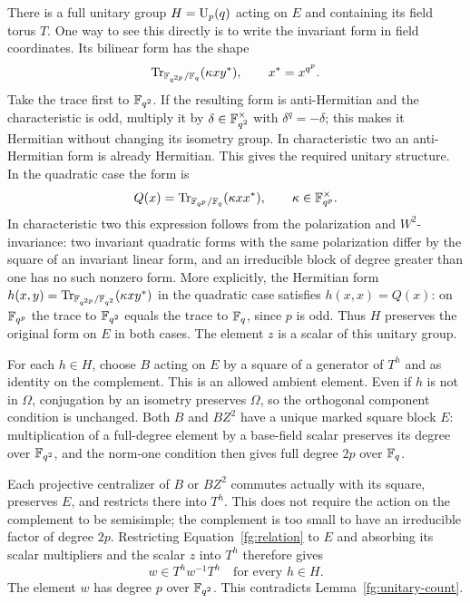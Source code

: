 There is a full unitary group $H=\operatorname{U}_p(q)$ acting on $E$ and
containing its field torus $T$. One way to see this directly is to
write the invariant form in field coordinates. Its bilinear form
has the shape
\[
 \operatorname{Tr}_{\mathbb F_{q^{2p}}/\mathbb F_q}(\kappa x y^*),\qquad x^*=x^{q^p}.
\]
Take the trace first to $\mathbb F_{q^2}$. If the resulting form is
anti-Hermitian and the characteristic is odd, multiply it by
$\delta\in\mathbb F_{q^2}^{\times}$ with $\delta^q=-\delta$; this makes
it Hermitian without changing its isometry group. In characteristic
two an anti-Hermitian form is already Hermitian. This gives the
required unitary structure. In the
quadratic case the form is
\[
 Q(x)=\operatorname{Tr}_{\mathbb F_{q^p}/\mathbb F_q}(\kappa xx^*),
 \qquad\kappa\in\mathbb F_{q^p}^\times.
\]
In characteristic two this expression follows from the polarization
and $W^2$-invariance: two invariant quadratic forms with the same
polarization differ by the square of an invariant linear form,
and an irreducible block of degree greater than one has no such
nonzero form. More explicitly, the Hermitian form
$h(x,y)=\operatorname{Tr}_{\mathbb F_{q^{2p}}/\mathbb F_{q^2}}(\kappa xy^*)$
in the quadratic case satisfies $h(x,x)=Q(x)$: on $\mathbb F_{q^p}$ the
trace to $\mathbb F_{q^2}$ equals the trace to $\mathbb F_q$, since $p$ is odd.
Thus $H$ preserves the original form on $E$ in both cases. The element
$z$ is a scalar of this unitary group.

For each $h\in H$, choose $B$ acting on $E$ by a square of a
generator of $T^h$ and as identity on the complement. This is an
allowed ambient element. Even if $h$ is not in $\Omega$, conjugation
by an isometry preserves $\Omega$, so the orthogonal component
condition is unchanged. Both $B$ and $BZ^2$ have a unique marked
square block $E$: multiplication of a full-degree element by a
base-field scalar preserves its degree over $\mathbb F_{q^2}$, and the
norm-one condition then gives full degree $2p$ over $\mathbb F_q$.

Each projective centralizer of $B$ or $BZ^2$ commutes actually with
its square, preserves $E$, and restricts there into $T^h$. This
does not require the action on the complement to be semisimple;
the complement is too small to have an irreducible factor of
degree $2p$. Restricting Equation~\eqref{fg:relation} to $E$
and absorbing its scalar multipliers and the scalar $z$ into $T^h$
therefore gives
\[
 w\in T^h w^{-1}T^h\quad\text{for every }h\in H.
\]
The element $w$ has degree $p$ over $\mathbb F_{q^2}$. This contradicts
Lemma~\ref{fg:unitary-count}.

